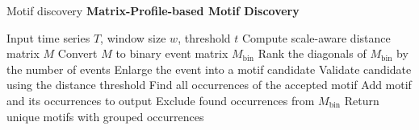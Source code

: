 \begin{frame}[allowframebreaks]{Motif discovery}
    \textbf{Matrix-Profile-based Motif Discovery \cite{vanonsem-2023-variable-length-motif-discovery-in-time-series-data}}
    \begin{algorithm}[H]
	\caption{Event-Driven Variable-Length Motif Discovery}
    \begin{algorithmic}[1]
        \State Input time series \(T\), window size \(w\), threshold \(t\)
        \State Compute scale-aware distance matrix \(M\)
        \State Convert \(M\) to binary event matrix \(M_{\mathrm{bin}}\)
        \State Rank the diagonals of \(M_{\mathrm{bin}}\) by the number of events
                \State Enlarge the event into a motif candidate
                \State Validate candidate using the distance threshold
                \State Find all occurrences of the accepted motif
                \State Add motif and its occurrences to output
                \State Exclude found occurrences from \(M_{\mathrm{bin}}\)
            \EndFor
        \EndFor
        \State Return unique motifs with grouped occurrences
    \end{algorithmic}
    \end{algorithm}
\end{frame}